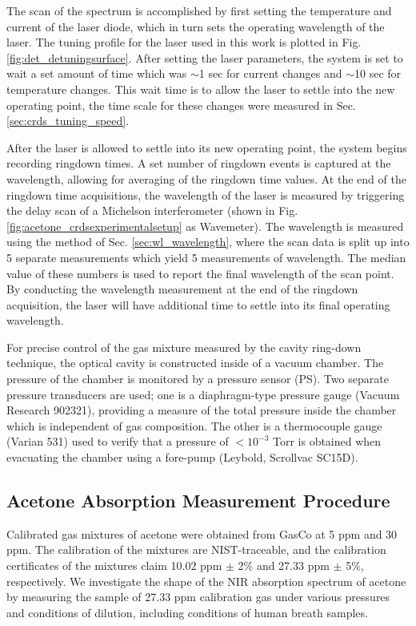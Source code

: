 \documentclass[8pt,a4paper]{report}
\begin{document}
	The scan of the spectrum is accomplished by first setting the temperature and current of the laser diode, which in turn sets the operating wavelength of the laser. The tuning profile for the laser used in this work is plotted in Fig. \ref{fig:det_detuningsurface}. After setting the laser parameters, the system is set to wait a set amount of time which was $\sim$1 sec for current changes and $\sim$10 sec for temperature changes. This wait time is to allow the laser to settle into the new operating point, the time scale for these changes were measured in Sec. \ref{sec:crds_tuning_speed}.
	
	After the laser is allowed to settle into its new operating point, the system begins recording ringdown times. A set number of ringdown events is captured at the wavelength, allowing for averaging of the ringdown time values. At the end of the ringdown time acquisitions, the wavelength of the laser is measured by triggering the delay scan of a Michelson interferometer (shown in Fig. \ref{fig:acetone_crdsexperimentalsetup} as Wavemeter). The wavelength is measured using the method of Sec. \ref{sec:wl_wavelength}, where the scan data is split up into 5 separate measurements which yield 5 measurements of wavelength. The median value of these numbers is used to report the final wavelength of the scan point. By conducting the wavelength measurement at the end of the ringdown acquisition, the laser will have additional time to settle into its final operating wavelength.
	
	For precise control of the gas mixture measured by the cavity ring-down technique, the optical cavity is constructed inside of a vacuum chamber. The pressure of the chamber is monitored by a pressure sensor (PS). Two separate pressure transducers are used; one is a diaphragm-type pressure gauge (Vacuum Research 902321), providing a measure of the total pressure inside the chamber which is independent of gas composition. The other is a thermocouple gauge (Varian 531) used to verify that a pressure of $<10^{-3}$ Torr is obtained when evacuating the chamber using a fore-pump (Leybold, Scrollvac SC15D).
	
	\subsection{Acetone Absorption Measurement Procedure}
	Calibrated gas mixtures of acetone were obtained from GasCo at 5 ppm and 30 ppm. The calibration of the mixtures are NIST-traceable, and the calibration certificates of the mixtures claim 10.02 ppm $\pm$ 2\% and 27.33 ppm $\pm$ 5\%, respectively. We investigate the shape of the NIR absorption spectrum of acetone by measuring the sample of 27.33 ppm calibration gas under various pressures and conditions of dilution, including conditions of human breath samples. 
	
\end{document}

